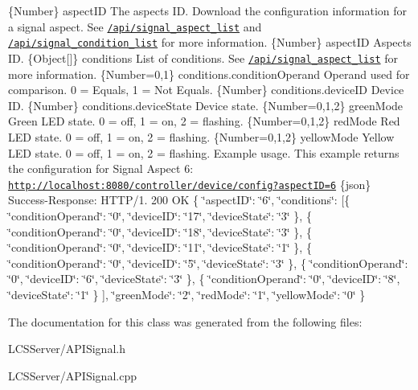 \{Number\} aspect\+ID The aspect\textquotesingle{}s ID.  Download the configuration information for a signal aspect. See \href{#api-Signal-SignalAspectList}{\tt /api/signal\+\_\+aspect\+\_\+list} and \href{#api-Signal-SignalAspectConditionList}{\tt /api/signal\+\_\+condition\+\_\+list} for more information.  \{Number\} aspect\+ID Aspect\textquotesingle{}s ID.  \{Object\mbox{[}\mbox{]}\} conditions List of conditions. See \href{#api-Signal-SignalAspectList}{\tt /api/signal\+\_\+aspect\+\_\+list} for more information.  \{Number=0,1\} conditions.\+condition\+Operand Operand used for comparison. 0 = Equals, 1 = Not Equals.  \{Number\} conditions.\+device\+ID Device ID.  \{Number\} conditions.\+device\+State Device state.  \{Number=0,1,2\} green\+Mode Green L\+ED state. 0 = off, 1 = on, 2 = flashing.  \{Number=0,1,2\} red\+Mode Red L\+ED state. 0 = off, 1 = on, 2 = flashing.  \{Number=0,1,2\} yellow\+Mode Yellow L\+ED state. 0 = off, 1 = on, 2 = flashing.  Example usage. This example returns the configuration for Signal Aspect 6\+: \href{http://localhost:8080/controller/device/config?aspectID=6}{\tt http\+://localhost\+:8080/controller/device/config?aspect\+I\+D=6}  \{json\} Success-\/\+Response\+: H\+T\+T\+P/1. 200 OK \{ \char`\"{}aspect\+I\+D\char`\"{}\+: \char`\"{}6\char`\"{}, \char`\"{}conditions\char`\"{}\+: \mbox{[}\{ \char`\"{}condition\+Operand\char`\"{}\+: \char`\"{}0\char`\"{}, \char`\"{}device\+I\+D\char`\"{}\+: \char`\"{}17\char`\"{}, \char`\"{}device\+State\char`\"{}\+: \char`\"{}3\char`\"{} \}, \{ \char`\"{}condition\+Operand\char`\"{}\+: \char`\"{}0\char`\"{}, \char`\"{}device\+I\+D\char`\"{}\+: \char`\"{}18\char`\"{}, \char`\"{}device\+State\char`\"{}\+: \char`\"{}3\char`\"{} \}, \{ \char`\"{}condition\+Operand\char`\"{}\+: \char`\"{}0\char`\"{}, \char`\"{}device\+I\+D\char`\"{}\+: \char`\"{}11\char`\"{}, \char`\"{}device\+State\char`\"{}\+: \char`\"{}1\char`\"{} \}, \{ \char`\"{}condition\+Operand\char`\"{}\+: \char`\"{}0\char`\"{}, \char`\"{}device\+I\+D\char`\"{}\+: \char`\"{}5\char`\"{}, \char`\"{}device\+State\char`\"{}\+: \char`\"{}3\char`\"{} \}, \{ \char`\"{}condition\+Operand\char`\"{}\+: \char`\"{}0\char`\"{}, \char`\"{}device\+I\+D\char`\"{}\+: \char`\"{}6\char`\"{}, \char`\"{}device\+State\char`\"{}\+: \char`\"{}3\char`\"{} \}, \{ \char`\"{}condition\+Operand\char`\"{}\+: \char`\"{}0\char`\"{}, \char`\"{}device\+I\+D\char`\"{}\+: \char`\"{}8\char`\"{}, \char`\"{}device\+State\char`\"{}\+: \char`\"{}1\char`\"{} \} \mbox{]}, \char`\"{}green\+Mode\char`\"{}\+: \char`\"{}2\char`\"{}, \char`\"{}red\+Mode\char`\"{}\+: \char`\"{}1\char`\"{}, \char`\"{}yellow\+Mode\char`\"{}\+: \char`\"{}0\char`\"{} \} 

The documentation for this class was generated from the following files\+:\begin{DoxyCompactItemize}
\item 
L\+C\+S\+Server/A\+P\+I\+Signal.\+h\item 
L\+C\+S\+Server/A\+P\+I\+Signal.\+cpp\end{DoxyCompactItemize}
